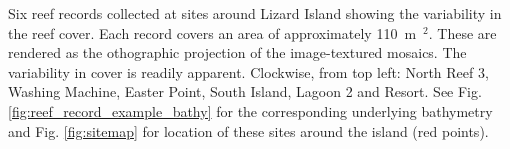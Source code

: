 \label{fig:six_samples} Six reef records collected at sites around Lizard Island showing the variability in the reef cover. Each record covers an area of approximately 110~m~$^2$. These are rendered as the othographic projection of the image-textured mosaics. The variability in cover is readily apparent. Clockwise, from top left: North Reef 3, Washing Machine, Easter Point, South Island, Lagoon 2 and Resort. See Fig. \ref{fig:reef_record_example_bathy} for the corresponding underlying bathymetry and Fig. \ref{fig:sitemap} for location of these sites around the island (red points).